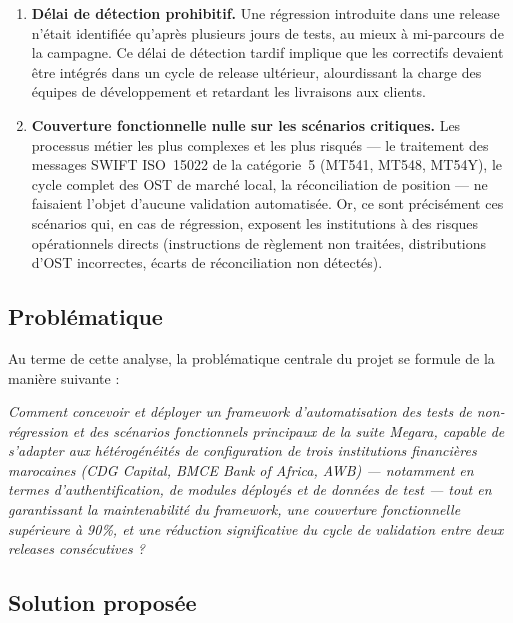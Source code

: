 \documentclass[12pt, a4paper]{report}
\begin{document}
\begin{enumerate}[label=\textbf{L\arabic*.}]
  \item \textbf{Délai de détection prohibitif.}
  Une régression introduite dans une release n'était identifiée qu'après plusieurs jours de tests, au mieux à mi-parcours de la campagne. Ce délai de détection tardif implique que les correctifs devaient être intégrés dans un cycle de release ultérieur, alourdissant la charge des équipes de développement et retardant les livraisons aux clients.

  \item \textbf{Couverture fonctionnelle nulle sur les scénarios critiques.}
  Les processus métier les plus complexes et les plus risqués — le traitement des messages SWIFT ISO~15022 de la catégorie~5 (MT541, MT548, MT54Y), le cycle complet des OST de marché local, la réconciliation de position — ne faisaient l'objet d'aucune validation automatisée. Or, ce sont précisément ces scénarios qui, en cas de régression, exposent les institutions à des risques opérationnels directs (instructions de règlement non traitées, distributions d'OST incorrectes, écarts de réconciliation non détectés).

\end{enumerate}

\subsection{Problématique}

Au terme de cette analyse, la problématique centrale du projet se formule de la manière suivante :

\begin{mdframed}[linecolor=vermegRed, linewidth=2pt, innertopmargin=12pt, innerbottommargin=12pt, innerleftmargin=14pt, innerrightmargin=14pt]
\textit{Comment concevoir et déployer un framework d'automatisation des tests de non-régression et des scénarios fonctionnels principaux de la suite Megara, capable de s'adapter aux hétérogénéités de configuration de trois institutions financières marocaines (CDG Capital, BMCE Bank of Africa, AWB) — notamment en termes d'authentification, de modules déployés et de données de test — tout en garantissant la maintenabilité du framework, une couverture fonctionnelle supérieure à 90\%, et une réduction significative du cycle de validation entre deux releases consécutives ?}
\end{mdframed}

\subsection{Solution proposée}
\end{document}
